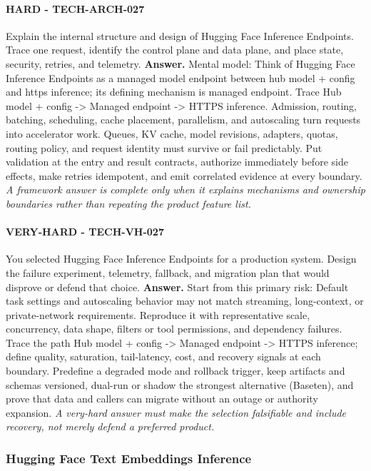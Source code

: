 \paragraph{HARD - TECH-ARCH-027} Explain the internal structure and design of Hugging Face Inference Endpoints. Trace one request, identify the control plane and data plane, and place state, security, retries, and telemetry.
\textbf{Answer.} Mental model: Think of Hugging Face Inference Endpoints as a managed model endpoint between hub model + config and https inference; its defining mechanism is managed endpoint. Trace Hub model + config -> Managed endpoint -> HTTPS inference. Admission, routing, batching, scheduling, cache placement, parallelism, and autoscaling turn requests into accelerator work. Queues, KV cache, model revisions, adapters, quotas, routing policy, and request identity must survive or fail predictably. Put validation at the entry and result contracts, authorize immediately before side effects, make retries idempotent, and emit correlated evidence at every boundary.
\textit{A framework answer is complete only when it explains mechanisms and ownership boundaries rather than repeating the product feature list.}
\paragraph{VERY-HARD - TECH-VH-027} You selected Hugging Face Inference Endpoints for a production system. Design the failure experiment, telemetry, fallback, and migration plan that would disprove or defend that choice.
\textbf{Answer.} Start from this primary risk: Default task settings and autoscaling behavior may not match streaming, long-context, or private-network requirements. Reproduce it with representative scale, concurrency, data shape, filters or tool permissions, and dependency failures. Trace the path Hub model + config -> Managed endpoint -> HTTPS inference; define quality, saturation, tail-latency, cost, and recovery signals at each boundary. Predefine a degraded mode and rollback trigger, keep artifacts and schemas versioned, dual-run or shadow the strongest alternative (Baseten), and prove that data and callers can migrate without an outage or authority expansion.
\textit{A very-hard answer must make the selection falsifiable and include recovery, not merely defend a preferred product.}
\subsubsection*{Hugging Face Text Embeddings Inference}
